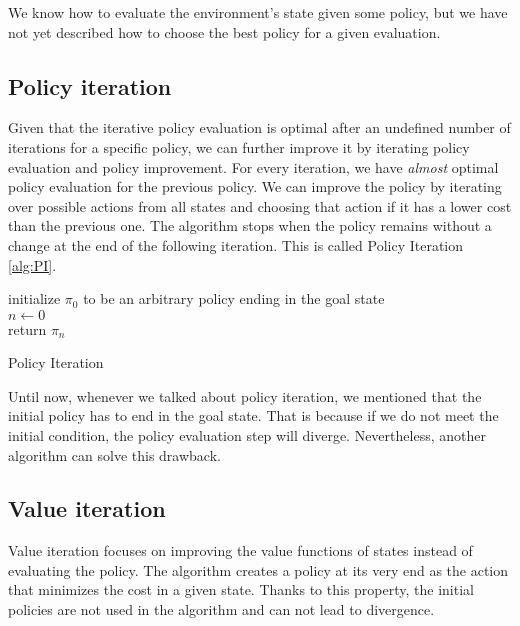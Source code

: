 We know how to evaluate the environment's state given some policy, but we have not yet described how to choose the best policy for a given evaluation. 

\subsection{Policy iteration}
Given that the iterative policy evaluation is optimal after an undefined number of iterations for a specific policy, we can further improve it by iterating policy evaluation and policy improvement.
For every iteration, we have \textit{almost} optimal policy evaluation for the previous policy. We can improve the policy by iterating over possible actions from all states and choosing that action if it has a lower cost than the previous one. The algorithm stops when the policy remains without a change at the end of the following iteration. This is called Policy Iteration \ref{alg:PI}.

\LinesNumbered
\begin{algorithm}[ht]
\SetAlgoLined
initialize $\pi_0$ to be an arbitrary policy ending in the goal state\\
$n \xleftarrow{} 0$ \\
return $\pi_n$
\caption{Policy Iteration}
\label{alg:PI}
\end{algorithm}

Until now, whenever we talked about policy iteration, we mentioned that the initial policy has to end in the goal state. That is because if we do not meet the initial condition, the policy evaluation step will diverge.
Nevertheless, another algorithm can solve this drawback.


\subsection{Value iteration}
Value iteration focuses on improving the value functions of states instead of evaluating the policy. The algorithm creates a policy at its very end as the action that minimizes the cost in a given state. Thanks to this property, the initial policies are not used in the algorithm and can not lead to divergence.

